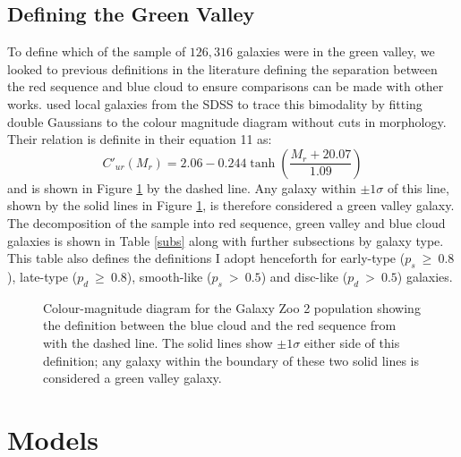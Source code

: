 \documentclass[useAMS,usenatbib]{mn2e}
\def\changed    {\color{titlecol} }
\begin{document}
\subsection{Defining the Green Valley}\label{defGV}

To define which of the sample of $126, 316$ galaxies were in the green valley, {\changed we looked to previous definitions in the literature defining the separation between the red sequence and blue cloud to ensure comparisons can be made with other works. \citet{Baldry04} used local galaxies from the SDSS to trace this bimodality by fitting double Gaussians to the colour magnitude diagram without cuts in morphology.} Their relation is definite in their equation 11 as:
\begin{equation}
C'_{ur}(M_{r}) = 2.06 - 0.244 \tanh \left( \frac{M_r + 20.07}{1.09}\right)
\end{equation}
and is shown in Figure \ref{CMGV} by the dashed line. Any galaxy within $\pm 1\sigma$ of this line, shown by the solid lines in Figure \ref{CMGV}, is therefore considered a green valley galaxy. The decomposition of the sample into red sequence, green valley and blue cloud galaxies is shown in Table \ref{subs} along with further subsections by galaxy type. This table also defines the definitions I adopt henceforth for early-type ($p_s~ \geq~0.8$), late-type ($p_d~ \geq~0.8$), smooth-like ($p_s~ >~0.5$) and disc-like ($p_d~ >~0.5$) galaxies.

\begin{figure}
\caption{Colour-magnitude diagram for the Galaxy Zoo 2 population showing the definition between the blue cloud and the red sequence from \citet{Baldry04} with the dashed line. The solid lines show $\pm 1\sigma$ either side of this definition; any galaxy within the boundary of these two solid lines is considered a green valley galaxy.}
\label{CMGV}
\end{figure}

\section{Models}\label{models}
\end{document}
